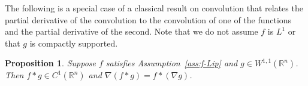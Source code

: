 \documentclass[11pt,reqno]{amsart}
\newcommand{\pl}{\partial}
\newcommand{\1}{{\bf 1}}
\newcommand{\2}{{\bf 2}}
\newcommand{\hb}[1]{\color{blue}{#1}}
\newcommand{\mr}[1]{{\color{blue}#1}}
\newcommand{\pc}[1]{{\color{cyan}#1}}
\newcommand{\us}[1]{\textcolor{red}{#1}}
\newcommand{\R}{\mathbb R}
\numberwithin{equation}{section}
\newtheorem{proposition}{Proposition}[section]
\newtheorem{assumption}{Assumption}[section]
\theoremstyle{remark}
\begin{document}
	The following is a special case of a classical result on convolution that relates the
	partial derivative of the convolution to the convolution of one of
	the functions and the partial derivative of the second. Note that we do not assume $f$ is $L^1$ or that $g$ is compactly supported.
		\begin{proposition}\label{prop:ConvSmooth}
			Suppose $f$ satisfies Assumption~\ref{ass:f-Lip} and $g \in W^{1,1}(\R^n)$. Then $f \ast g \in C^1(\R^n)$ and $\nabla(f \ast g) = f \ast (\nabla g)$.	
		\end{proposition}
\end{document}

